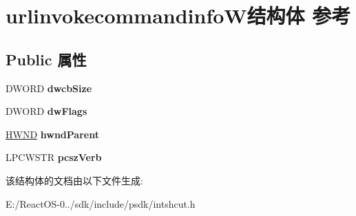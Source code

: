 \hypertarget{structurlinvokecommandinfo_w}{}\section{urlinvokecommandinfo\+W结构体 参考}
\label{structurlinvokecommandinfo_w}
\subsection*{Public 属性}
\begin{DoxyCompactItemize}
\item 
\mbox{\label{structurlinvokecommandinfo_w_ade3ca580ea1ae9abedab72f606e05855}} 
D\+W\+O\+RD {\bfseries dwcb\+Size}
\item 
\mbox{\label{structurlinvokecommandinfo_w_ac54eb71cf1c5402dbe0a5351577cb9ef}} 
D\+W\+O\+RD {\bfseries dw\+Flags}
\item 
\mbox{\label{structurlinvokecommandinfo_w_a255af8d12355dad5e0b097fb8ea0ac7b}} 
\hyperlink{interfacevoid}{H\+W\+ND} {\bfseries hwnd\+Parent}
\item 
\mbox{\label{structurlinvokecommandinfo_w_a2a23f31c447bb21f4f66c870d1c4a988}} 
L\+P\+C\+W\+S\+TR {\bfseries pcsz\+Verb}
\end{DoxyCompactItemize}


该结构体的文档由以下文件生成\+:\begin{DoxyCompactItemize}
\item 
E\+:/\+React\+O\+S-\/0../sdk/include/psdk/intshcut.\+h\end{DoxyCompactItemize}
